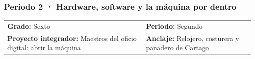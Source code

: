 
\subsubsection{Periodo 2 · Hardware, software y la máquina por dentro}
\noindent\begin{tabular}{ll}
\textbf{Grado:} Sexto & \textbf{Periodo:} Segundo \\
\textbf{Proyecto integrador:} Maestros del oficio digital: abrir la máquina & \textbf{Anclaje:} Relojero, costurera y panadero de Cartago \\
\end{tabular}
\medskip

